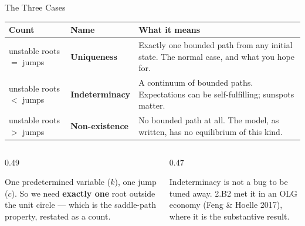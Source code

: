 \begin{frame}{The Three Cases}
\small
\begin{center}
\begin{tabularx}{0.97\linewidth}{@{}>{\raggedright\arraybackslash}p{2.9cm} >{\raggedright\arraybackslash}p{3.0cm} >{\raggedright\arraybackslash}X@{}}
\toprule
\textbf{Count} & \textbf{Name} & \textbf{What it means} \\
\midrule
unstable roots $=$ jumps & \textbf{Uniqueness} & Exactly one bounded path from any initial state. The normal case, and what you hope for. \\
unstable roots $<$ jumps & \textbf{Indeterminacy} & A continuum of bounded paths. Expectations can be self-fulfilling; sunspots matter. \\
unstable roots $>$ jumps & \textbf{Non-existence} & No bounded path at all. The model, as written, has no equilibrium of this kind. \\
\bottomrule
\end{tabularx}
\end{center}
\medskip
\begin{columns}[T]
\begin{column}{0.49\textwidth}
\begin{conceptbox}[title=\textbf{In the growth model}]\footnotesize
One predetermined variable ($k$), one jump ($c$). So we need \textbf{exactly one} root outside the unit circle --- which is the saddle-path property, restated as a count.
\end{conceptbox}
\end{column}
\begin{column}{0.47\textwidth}
\begin{cautionbox}\footnotesize
Indeterminacy is not a bug to be tuned away. 2.B2 met it in an OLG economy (Feng \& Hoelle 2017), where it is the substantive result.
\end{cautionbox}
\end{column}
\end{columns}
\vspace{1mm}
\end{frame}

